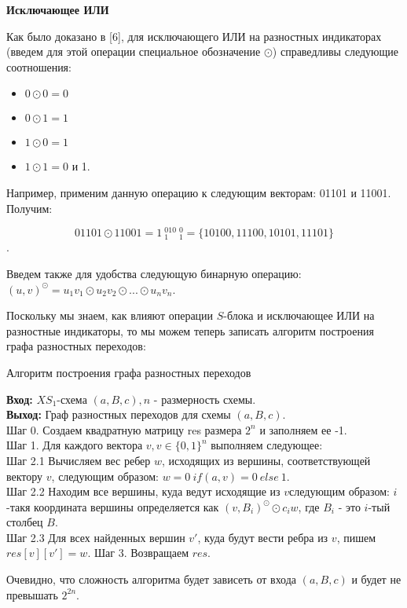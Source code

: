 \documentclass[a4paper,12pt]{extarticle}
\theoremstyle{plain} %
\begin{document}
\begin{large}
\textbf{Исключающее ИЛИ}

 Как было доказано в [6], для исключающего ИЛИ на разностных индикаторах (введем для этой операции специальное обозначение $\odot$) справедливы следующие соотношения:

\begin{itemize}
\item $0 \odot 0 = 0$
\item $0 \odot 1 = 1$
\item $1 \odot 0= 1$
\item $1 \odot 1 = 0$ и 1. 
\end{itemize}

Например, применим данную операцию к следующим векторам: 01101 и 11001. Получим:

$$01101 \odot 11001 = 1~_{1}^010~_{1}^0 = \{10100, 11100, 10101, 11101\}$$.

Введем также для удобства следующую бинарную операцию: $(u, v)^{\odot} = u_1v_1 \odot u_2v_2 \odot ... \odot u_nv_n$.

Поскольку мы знаем, как влияют операции $S$-блока и исключающее ИЛИ на разностные индикаторы, то мы можем теперь записать алгоритм построения графа разностных переходов:

\begin{algorithm}[H]
\caption{Алгоритм построения графа разностных переходов}
\label{diff_graph_construct}
\textbf{Вход:} $XS_1$-схема $(a, B, c), n$ - размерность схемы.\\
\textbf{Выход:} Граф разностных переходов для схемы $(a, B, c)$.\\
Шаг 0. Создаем квадратную матрицу res размера $2^n$ и заполняем ее -1. \\
Шаг 1. Для каждого вектора $v, v \in \{0, 1\}^n$ выполняем следующее: \\
Шаг 2.1 Вычисляем вес ребер $w$, исходящих из вершины, соответствующей вектору $v$, следующим образом: $w = 0~ if (a,v) = 0 ~else ~1$.\\
Шаг 2.2 Находим все вершины, куда ведут исходящие из $v$следующим образом: $i$-такя координата вершины определяется как $(v, B_i)^{\odot} \odot c_iw$, где $B_i$ - это $i$-тый столбец $B$. \\
Шаг 2.3 Для всех найденных вершин $v'$, куда будут вести ребра из $v$, пишем $res[v][v'] = w$.
Шаг 3. Возвращаем $res$.\\
\end{algorithm}

Очевидно, что сложность алгоритма будет зависеть от входа $(a,B,c)$ и будет не превышать $2^{2n}$.


\end{large}
\end{document}
